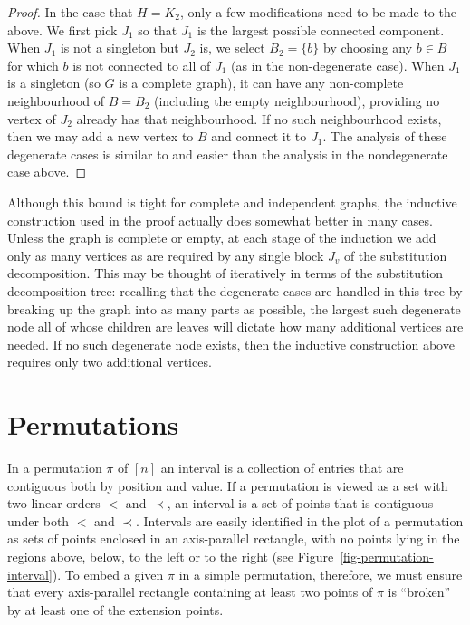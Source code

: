 \documentclass[11pt]{article}
\begin{document}
\begin{proof}
In the case that $H=K_2$, only a few modifications need to be made to the above. We first pick $J_1$ so that $\overline{J_1}$ is the largest possible connected component. When $J_1$ is not a singleton but $J_2$ is, we select $B_2=\{b\}$ by choosing any $b\in B$ for which $b$ is not connected to all of $J_1$ (as in the non-degenerate case). When $J_1$ is a singleton (so $G$ is a complete graph), it can have any non-complete neighbourhood of $B=B_2$ (including the empty neighbourhood), providing no vertex of $J_2$ already has that neighbourhood. If no such neighbourhood exists, then we may add a new vertex to $B$ and connect it to $J_1$. The analysis of these degenerate cases is similar to and easier than the analysis in the nondegenerate case above.
\end{proof}

Although this bound is tight for complete and independent graphs, the inductive construction used in the proof actually does somewhat better in many cases. Unless the graph is complete or empty, at each stage of the induction we add only as many vertices as are required by any single block $J_v$ of the substitution decomposition. This may be thought of iteratively in terms of the substitution decomposition tree: recalling that the degenerate cases are handled in this tree by breaking up the graph into as many parts as possible, the largest such degenerate node all of whose children are leaves will dictate how many additional vertices are needed. If no such degenerate node exists, then the inductive construction above requires only two additional vertices.

\section{Permutations}\label{sec-permutations}

In a permutation $\pi$ of $[n]$ an interval is a collection of entries that are
contiguous both by position and value. If a permutation is viewed as a set with two linear orders $<$ and $\prec$, an interval is a set of points that is contiguous under both
$<$ and $\prec$. Intervals are  easily identified in the plot of a permutation as sets of points enclosed in an axis-parallel rectangle, with no points lying in the regions above, below, to the left or to the right (see Figure~\ref{fig-permutation-interval}). To embed a given $\pi$ in a simple permutation, therefore, we must ensure that every axis-parallel rectangle containing at least two points of $\pi$
is ``broken'' by at least one of the extension points.
\end{document}
